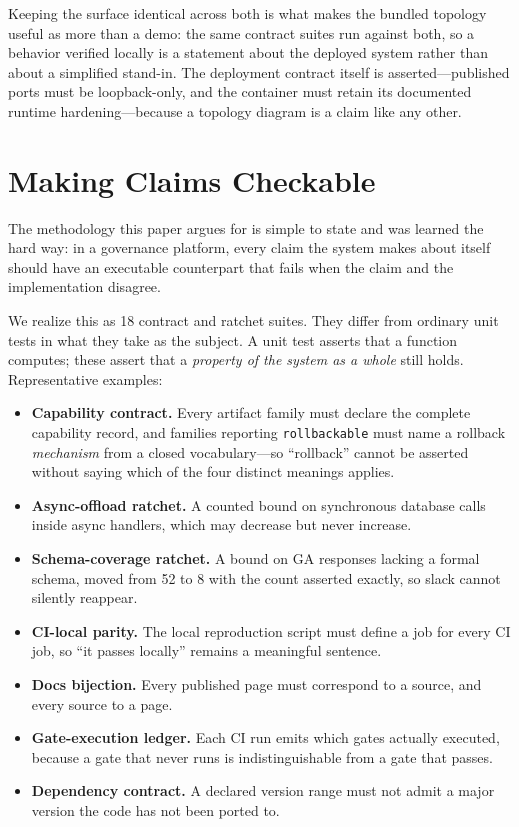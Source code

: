 \documentclass{article}
\newcommand{\code}[1]{\texttt{#1}}
\begin{document}
Keeping the surface identical across both is what makes the bundled topology
useful as more than a demo: the same contract suites run against both, so a
behavior verified locally is a statement about the deployed system rather than
about a simplified stand-in. The deployment contract itself is asserted---published
ports must be loopback-only, and the container must retain its documented runtime
hardening---because a topology diagram is a claim like any other.

\section{Making Claims Checkable}
\label{sec:invariants}

The methodology this paper argues for is simple to state and was learned the hard
way: in a governance platform, every claim the system makes about itself should
have an executable counterpart that fails when the claim and the implementation
disagree.

We realize this as 18 contract and ratchet suites. They differ from ordinary unit
tests in what they take as the subject. A unit test asserts that a function
computes; these assert that a \emph{property of the system as a whole} still holds.
Representative examples:

\begin{itemize}[leftmargin=1.1em]
\item \textbf{Capability contract.} Every artifact family must declare the complete
capability record, and families reporting \code{rollbackable} must name a rollback
\emph{mechanism} from a closed vocabulary---so ``rollback'' cannot be asserted
without saying which of the four distinct meanings applies.
\item \textbf{Async-offload ratchet.} A counted bound on synchronous database calls
inside async handlers, which may decrease but never increase.
\item \textbf{Schema-coverage ratchet.} A bound on GA responses lacking a formal
schema, moved from 52 to 8 with the count asserted exactly, so slack cannot
silently reappear.
\item \textbf{CI-local parity.} The local reproduction script must define a job for
every CI job, so ``it passes locally'' remains a meaningful sentence.
\item \textbf{Docs bijection.} Every published page must correspond to a source, and
every source to a page.
\item \textbf{Gate-execution ledger.} Each CI run emits which gates actually
executed, because a gate that never runs is indistinguishable from a gate that
passes.
\item \textbf{Dependency contract.} A declared version range must not admit a major
version the code has not been ported to.
\end{itemize}
\end{document}

